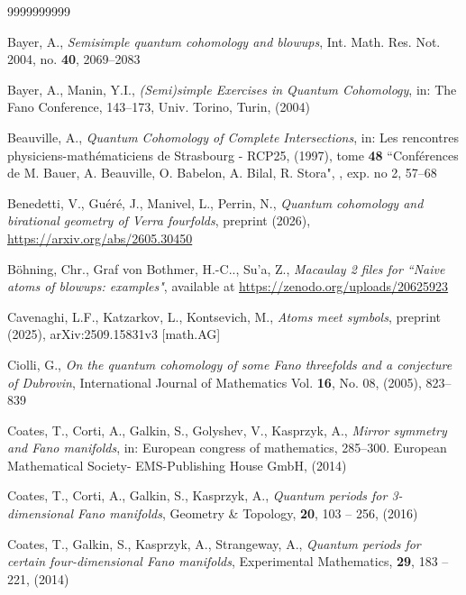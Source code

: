 \documentclass[11pt]{amsart}
\theoremstyle{plain}
\numberwithin{equation}{section}
\theoremstyle{definition}
\theoremstyle{remark}
\begin{document}
\FloatBarrier
\begin{thebibliography}{9999999999}

Bayer, A., \emph{Semisimple quantum cohomology and blowups}, Int. Math. Res. Not. 2004, no. \textbf{40}, 2069--2083

Bayer, A., Manin, Y.I., \emph{(Semi)simple Exercises in Quantum Cohomology}, in: The Fano Conference, 143--173, Univ. Torino, Turin, (2004)

Beauville, A., 
\emph{Quantum Cohomology of Complete Intersections}, in: 
Les rencontres physiciens-math\'{e}maticiens de Strasbourg - RCP25, (1997), tome \textbf{48} 
 ``Conf\'{e}rences de M. Bauer, A. Beauville, O. Babelon, A. Bilal, R. Stora", , exp. no 2, 57--68

Benedetti, V., Gu\'{e}r\'{e}, J., Manivel, L., Perrin, N., \emph{ Quantum cohomology and birational geometry of Verra fourfolds}, 
preprint (2026), \href{https://arxiv.org/abs/2605.30450}{https://arxiv.org/abs/2605.30450}

B\"ohning, Chr., Graf von Bothmer, H.-C.., Su'a, Z., \emph{Macaulay 2 files for ``Naive atoms of blowups: examples"}, available at \href{https://zenodo.org/uploads/20625923}{https://zenodo.org/uploads/20625923}

Cavenaghi, L.F., Katzarkov, L., Kontsevich, M., \emph{Atoms meet symbols}, preprint (2025),  arXiv:2509.15831v3 [math.AG]

Ciolli, G., \emph{On the quantum cohomology of some Fano threefolds and a conjecture of Dubrovin}, International Journal of Mathematics Vol. \textbf{16}, No. 08, (2005), 823--839 

Coates, T., Corti, A., Galkin, S., Golyshev, V., Kasprzyk, A., \emph{Mirror symmetry and Fano manifolds}, in: European congress of mathematics, 285--300. European Mathematical Society- EMS-Publishing House GmbH, (2014)

Coates, T., Corti, A., Galkin, S., Kasprzyk, A.,
\emph{Quantum periods for 3-dimensional Fano manifolds}, Geometry \& Topology, \textbf{20}, 103 -- 256, (2016)


Coates, T., Galkin, S., Kasprzyk, A., Strangeway, A.,
\emph{Quantum periods for certain four-dimensional Fano manifolds},  Experimental Mathematics, \textbf{29}, 183 -- 221, (2014)



\end{thebibliography}
\end{document}
